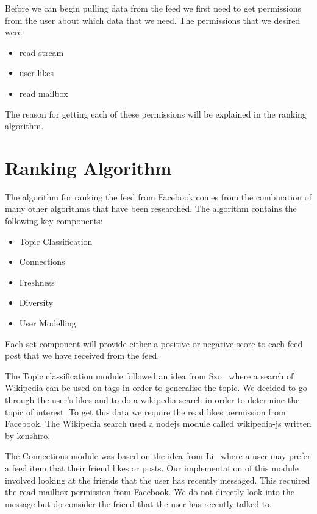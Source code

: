 Before we can begin pulling data from the feed we first need to get permissions from the user about which data that we need. The permissions that we desired were:

\begin{itemize}
	\item read stream
  	\item user likes
	\item read mailbox
\end{itemize}

The reason for getting each of these permissions will be explained in the ranking algorithm.

\section{Ranking Algorithm}

The algorithm for ranking the feed from Facebook comes from the combination of many other algorithms that have been researched. The algorithm contains the following key components:

\begin{itemize}
	\item Topic Classification
 	\item Connections
  	\item Freshness
	\item Diversity
	\item User Modelling
\end{itemize}

Each set component will provide either a positive or negative score to each feed post that we have received from the feed. 

The Topic classification module followed an idea from Szo~\cite{szomszor2008semantic} where a search of Wikipedia can be used on tags in order to generalise the topic. We decided to go through the user's likes and to do a wikipedia search in order to determine the topic of interest. To get this data we require the read likes permission from Facebook. The Wikipedia search used a nodejs module called wikipedia-js written by kenshiro.

The Connections module was based on the idea from Li~\cite{LiTiaLee2010} where a user may prefer a feed item that their friend likes or posts. Our implementation of this module involved looking at the friends that the user has recently messaged. This required the read mailbox permission from Facebook. We do not directly look into the message but do consider the friend that the user has recently talked to. 

